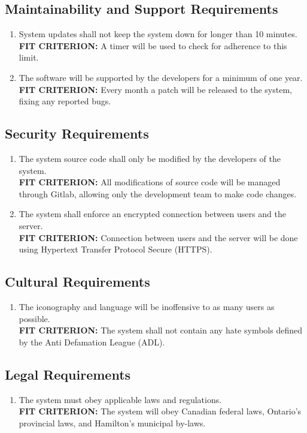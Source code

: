\documentclass[12pt, titlepage]{article}
\begin{document}
\subsection{Maintainability and Support Requirements}
\begin{enumerate}[{MSR}1. ]
    \item System updates shall not keep the system down for longer than 10 minutes.
    \\\textbf{FIT CRITERION:} A timer will be used to check for adherence to this limit. 
    \item The software will be supported by the developers for a minimum of one year.
    \\\textbf{FIT CRITERION:} Every month a patch will be released to the system, fixing any reported bugs.
\end{enumerate}
\subsection{Security Requirements}
\begin{enumerate}[{SR}1. ]
    \item The system source code shall only be modified by the developers of the system.
    \\\textbf{FIT CRITERION:} All modifications of source code will be managed through Gitlab, allowing only the development team to make code changes.
    \item The system shall enforce an encrypted connection between users and the server.
    \\\textbf{FIT CRITERION:} Connection between users and the server will be done using Hypertext Transfer Protocol Secure (HTTPS).
\end{enumerate}
\subsection{Cultural Requirements}
\begin{enumerate}[{CR}1. ]
    \item The iconography and language will be inoffensive to as many users as possible.
    \\\textbf{FIT CRITERION:} The system shall not contain any hate symbols defined by the Anti Defamation League (ADL). \cite{adl}
\end{enumerate}
\subsection{Legal Requirements}
\begin{enumerate}[{LR}1. ]
    \item The system must obey applicable laws and regulations.
    \\\textbf{FIT CRITERION:} The system will obey Canadian federal laws, Ontario's provincial laws, and Hamilton's municipal by-laws.
\end{enumerate}
\end{document}
